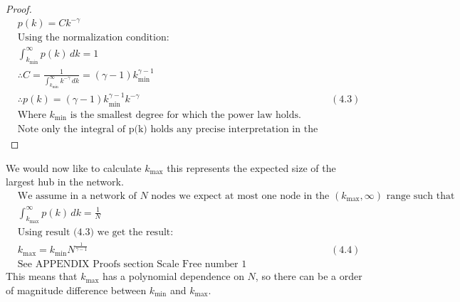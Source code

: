 \documentclass{article}
\begin{document}
\begin{proof}
\begin{align*}
                    &p(k) = Ck^{-\gamma}\\
                    &\text{Using the normalization condition:}\\
                    &\int_{k_{\text{min}}}^{\infty}p(k) \,dk = 1\\
                    &\therefore C = \frac{1}{\int_{k_{\text{min}}}^{\infty}k^{-\gamma} \,dk} = (\gamma -1)k_{\text{min}}^{\gamma-1}\\
                    &\therefore p(k) = (\gamma -1)k_{\text{min}}^{\gamma-1}k^{-\gamma}  &(4.3)\\
                    &\text{Where $k_{\text{min}}$ is the smallest degree for which the power law holds.}\\
                    &\text{Note only the integral of p(k) holds any precise interpretation in the continuum formalism}
                \end{align*}
            \end{proof}
            We would now like to calculate $k_{\text{max}}$ this represents the expected size of the largest hub in the network.
            \begin{align*}
                &\text{We assume in a network of $N$ nodes we expect at most one node in the $(k_{\text{max}},\infty)$ range such that}\\
                &\int_{k_{\text{max}}}^{\infty}p(k) \,dk = \frac{1}{N}\\
                &\text{Using result (4.3) we get the result:}\\
                &k_{\text{max}} = k_{\text{min}}N^{\frac{1}{\gamma -1}} &(4.4)\\
                &\text{See APPENDIX Proofs section Scale Free number 1 }
            \end{align*}
            This means that $k_{\text{max}}$ has a polynomial dependence on $N$, so there can be a order of magnitude difference between $k_{\text{min}}$ and $k_{\text{max}}$.\\
\end{document}
